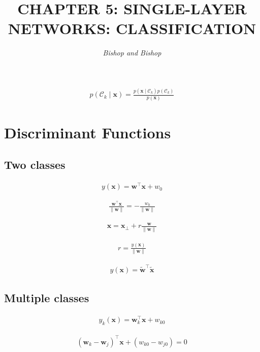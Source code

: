 \documentclass{article}
\title{\LARGE\scshape\MakeUppercase{Chapter 5: Single-layer Networks: Classification}}
\author{\textit{Bishop and Bishop}}
\date{}
\begin{document}
\maketitle

\begin{align*}
p\left(\mathcal{C}_{k} \mid \mathbf{x}\right)=\frac{p\left(\mathbf{x} \mid \mathcal{C}_{k}\right) p\left(\mathcal{C}_{k}\right)}{p(\mathbf{x})}
\tag{5.1}
\end{align*}

\section{Discriminant Functions}

\subsection{Two classes}

\begin{align*}
y(\mathbf{x}) = \mathbf{w}^{\top} \mathbf{x} + w_0 
\tag{5.2}
\end{align*}

\begin{align*}
\frac{\mathbf{w}^{\top} \mathbf{x}}{\|\mathbf{w}\|} = -\frac{w_0}{\|\mathbf{w}\|}
\tag{5.3}
\end{align*}

\begin{align*}
\mathbf{x} = \mathbf{x}_{\perp} + r \frac{\mathbf{w}}{\|\mathbf{w}\|}
\tag{5.4}
\end{align*}

\begin{align*}
r = \frac{y(\mathbf{x})}{\|\mathbf{w}\|}
\tag{5.5}
\end{align*}

\begin{align*}
y(\mathbf{x}) = \widetilde{\mathbf{w}}^{\top} \widetilde{\mathbf{x}}
\tag{5.6}
\end{align*}

\subsection{Multiple classes}

\begin{align*}
y_k(\mathbf{x}) = \mathbf{w}_k^{\top} \mathbf{x} + w_{k0}
\tag{5.7}
\end{align*}

\begin{align*}
\left(\mathbf{w}_k - \mathbf{w}_j\right)^{\top} \mathbf{x} + \left(w_{k0} - w_{j0}\right) = 0
\tag{5.8}
\end{align*}
\end{document}
